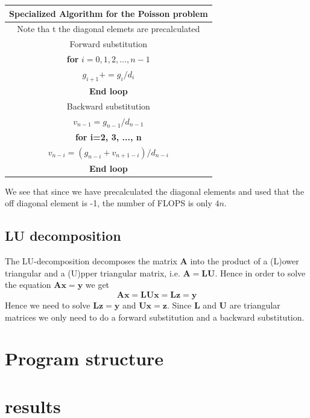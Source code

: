 \documentclass[10pt]{article}
\begin{document}
\begin{center}
  \begin{tabular}{||c||}
    \hline\hline
    \textbf{Specialized Algorithm for the Poisson problem}\\
    \hline\hline Note tha
    t the diagonal elemets are precalculated\\
    Forward substitution \\
    \textbf{for} $i=0,1,2,...,n-1$\\
      $g_{i+1}+=g_i/d_i$\\
      \textbf{End loop} \\
      Backward substitution \\
      $v_{n-1}=g_{n-1}/d_{n-1}$\\
      \textbf{for i=2, 3, ..., n} \\
      $v_{n-i}=(g_{n-i}+v_{n+1-i})/d_{n-i}$\\ 
      \textbf{End loop}\\
      \hline\hline
  \end{tabular}
\end{center}
 We see that since we have precalculated the diagonal elements and used that the off diagonal element is -1, the number of FLOPS is only $4n$.

\subsection{LU decomposition}
The LU-decomposition decomposes the matrix $\mathbf{A}$ into the product of a (L)ower triangular and a (U)pper triangular matrix, i.e. $\mathbf{A}=\mathbf{L}\mathbf{U}$. Hence in order to solve the equation $\mathbf{A}\mathbf{x}=\mathbf{y}$ we get $$\mathbf{A}\mathbf{x}=\mathbf{L}\mathbf{U}\mathbf{x}=\mathbf{L}\mathbf{z}=\mathbf{y} $$
Hence we need to solve $\mathbf{L}\mathbf{z}=\mathbf{y}$ and $\mathbf{U}\mathbf{x}=\mathbf{z}$. Since $\mathbf{L}$ and $\mathbf{U}$ are triangular matrices we only need to do a forward substitution and a backward substitution. 

\section{Program structure}



\section{results}
\end{document}
